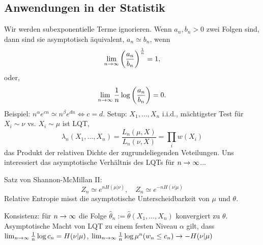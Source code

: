 \subsection{Anwendungen in der Statistik}
\begin{outline}
\0 Wir werden subexponentielle Terme ignorieren. Wenn $a_n, b_n > 0$ zwei Folgen sind, dann sind sie asymptotisch äquivalent, $a_n \simeq b_n$, wenn 
$$\lim_{n\rightarrow\infty}\left(\frac{a_n}{b_n}\right)^\frac{1}{n}=1,$$ 
oder, 
$$\lim_{n\rightarrow\infty}\frac{1}{n}\log\left(\frac{a_n}{b_n}\right)=0.$$ 
    \1 Beispiel: $n^\alpha e^{cn}\simeq n^\beta e^{dn} \iff c=d$.
    \1 Setup: $X_1,\ldots,X_n$ i.i.d., mächtigster Test für $X_i\sim \nu$ vs. $X_i\sim \mu$ ist LQT, $$\lambda_n(X_1,\ldots,X_n)=\frac{L_n(\mu,X)}{L_n(\nu,X)}=\prod_i w(X_i)$$ das Produkt der relativen Dichte der zugrundeliegenden Veteilungen. Uns interessiert das asymptotische Verhältnis des LQTs für $n\rightarrow\infty$...

\1 Satz von Shannon-McMillan II:
$$Z_n \simeq e^{nH(\mu|\nu)}, \quad Z_n\simeq e^{-nH(\nu|\mu)}$$
Relative Entropie misst die asymptotische Unterscheidbarkeit von $\mu$ und $\theta$.

\1 Konsistenz: für $n\rightarrow\infty$ die Folge $\hat{\theta}_n := \hat{\theta}(X_1,\ldots,X_n)$ konvergiert zu $\theta$.
\1 Asymptotische Macht von LQT 
    \2 zu einem festen Niveau $\alpha$ gilt, dass $\lim_{n\rightarrow\infty} \frac{1}{n}\log c_n = H(\nu | \mu)$,
    \2 $\lim_{n\rightarrow\infty} \frac{1}{n} \log \mu^n (w_n\leq c_n) \rightarrow -H(\nu | \mu)$
\end{outline}


